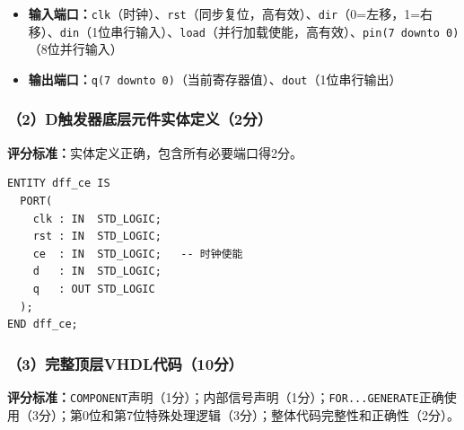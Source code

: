 \begin{itemize}
\item \textbf{输入端口：}\texttt{clk}（时钟）、\texttt{rst}（同步复位，高有效）、\texttt{dir}（0=左移，1=右移）、\texttt{din}（1位串行输入）、\texttt{load}（并行加载使能，高有效）、\texttt{pin(7 downto 0)}（8位并行输入）
\item \textbf{输出端口：}\texttt{q(7 downto 0)}（当前寄存器值）、\texttt{dout}（1位串行输出）
\end{itemize}

\subsubsection{（2）D触发器底层元件实体定义（2分）}

\begin{framed}
\textbf{评分标准：}实体定义正确，包含所有必要端口得2分。
\end{framed}

\begin{lstlisting}[language=VDL]
ENTITY dff_ce IS
  PORT(
    clk : IN  STD_LOGIC;
    rst : IN  STD_LOGIC;
    ce  : IN  STD_LOGIC;   -- 时钟使能
    d   : IN  STD_LOGIC;
    q   : OUT STD_LOGIC
  );
END dff_ce;
\end{lstlisting}

\subsubsection{（3）完整顶层VHDL代码（10分）}

\begin{framed}
\textbf{评分标准：}\texttt{COMPONENT}声明（1分）；内部信号声明（1分）；\texttt{FOR...GENERATE}正确使用（3分）；第0位和第7位特殊处理逻辑（3分）；整体代码完整性和正确性（2分）。
\end{framed}

